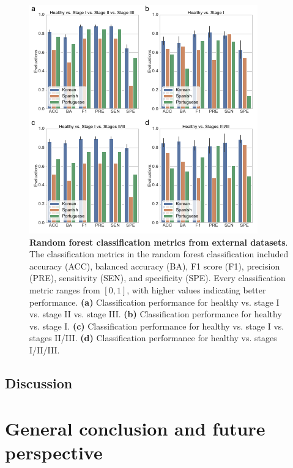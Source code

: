 \documentclass[11pt, a4paper, onecolumn, oneside]{report}
\begin{document}
            \begin{figure}[p]
                \centering
                \includegraphics[width=12 cm]{Figures/Periodontitis/Figure_S4.pdf}
                \caption[Random forest classification metrics from external datasets]{\textbf{Random forest classification metrics from external datasets}. The classification metrics in the random forest classification included accuracy (ACC), balanced accuracy (BA), F1 score (F1), precision (PRE), sensitivity (SEN), and specificity (SPE). Every classification metric ranges from $[0, 1]$, with higher values indicating better performance. \textbf{(a)} Classification performance for healthy vs. stage I vs. stage II vs. stage III. \textbf{(b)} Classification performance for healthy vs. stage I. \textbf{(c)} Classification performance for healthy vs. stage I vs. stages II/III. \textbf{(d)} Classification performance for healthy vs. stages I/II/III.}
                \label{fig:Periodontitis-validation}
            \end{figure}
            \clearpage
        \newpage

        \subsection{Discussion}
        \newpage

    \section{General conclusion and future perspective}
        \label{section:conclusion}
\end{document}
